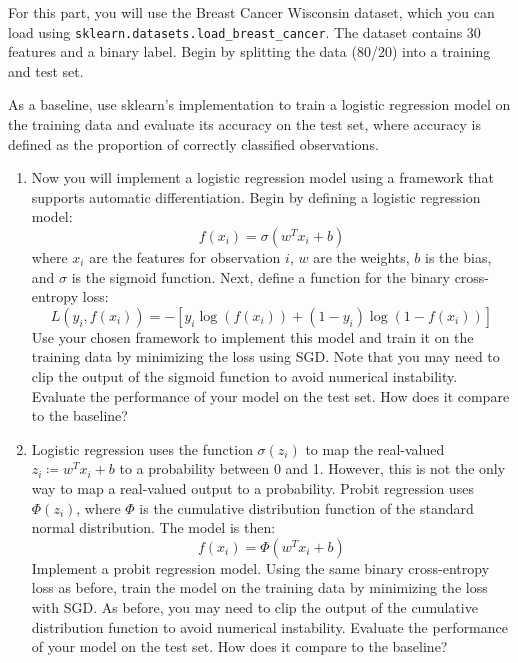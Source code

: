 \documentclass{article}
\newcounter{exercise}
\begin{document}
\begin{exercise}[Classification]
  For this part, you will use the Breast Cancer Wisconsin dataset, which you can load using \texttt{sklearn.datasets.load\_breast\_cancer}. The dataset contains 30 features and a binary label. Begin by splitting the data (80/20) into a training and test set.

  As a baseline, use sklearn's implementation to train a logistic regression model on the training data and evaluate its accuracy on the test set, where accuracy is defined as the proportion of correctly classified observations.
  \begin{enumerate}[label=(\alph*)]
    \item Now you will implement a logistic regression model using a framework that supports automatic differentiation. Begin by defining a logistic regression model:
      \[
        f(x_i) = \sigma(w^T x_i + b)
      \]
      where $x_i$ are the features for observation $i$, $w$ are the weights, $b$ is the bias, and $\sigma$ is the sigmoid function. Next, define a function for the binary cross-entropy loss:
      \[
        L(y_i, f(x_i)) = -\left[y_i \log(f(x_i)) + (1 - y_i)\log(1 - f(x_i))\right]
      \]
      Use your chosen framework to implement this model and train it on the training data by minimizing the loss using SGD. Note that you may need to clip the output of the sigmoid function to avoid numerical instability. Evaluate the performance of your model on the test set. How does it compare to the baseline?
    \item Logistic regression uses the function $\sigma(z_i)$ to map the real-valued $z_i \coloneqq w^T x_i + b$ to a probability between 0 and 1. However, this is not the only way to map a real-valued output to a probability. Probit regression uses $\Phi(z_i)$, where $\Phi$ is the cumulative distribution function of the standard normal distribution. The model is then:
      \[
        f(x_i) = \Phi(w^T x_i + b)
      \]
      Implement a probit regression model. Using the same binary cross-entropy loss as before, train the model on the training data by minimizing the loss with SGD. As before, you may need to clip the output of the cumulative distribution function to avoid numerical instability. Evaluate the performance of your model on the test set. How does it compare to the baseline?
  \end{enumerate}
\end{exercise}
\end{document}
